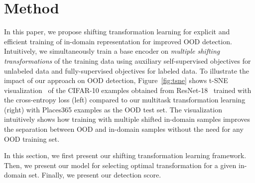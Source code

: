 \documentclass[letterpaper]{article} \usepackage{aaai22}  \usepackage{times}  \usepackage{helvet}  \usepackage{courier}  \usepackage[hyphens]{url}  \usepackage{graphicx} \urlstyle{rm} \def\UrlFont{\rm}  \usepackage{natbib}  \usepackage{caption} \DeclareCaptionStyle{ruled}{labelfont=normalfont,labelsep=colon,strut=off} \frenchspacing  \setlength{\pdfpagewidth}{8.5in}  \setlength{\pdfpageheight}{11in}
\begin{document}
%
  

\section{Method}
\label{sec:method}



In this paper, we propose shifting transformation learning for explicit and efficient training of in-domain representation for improved OOD detection.  
Intuitively, we simultaneously train a base encoder on \textit{multiple shifting transformations} of the training data using auxiliary self-supervised objectives for unlabeled data and fully-supervised objectives for labeled data.
To illustrate the impact of our approach on OOD detection, Figure~\ref{fig:tsne} shows t-SNE visualization~\cite{van2008visualizing} of the CIFAR-10 examples obtained from ResNet-18~\cite{he2016deep} trained with the cross-entropy loss (left) compared to our multitask transformation learning (right) with Places365 examples as the OOD test set.
The visualization intuitively shows how training with multiple shifted in-domain samples improves the separation between OOD and in-domain samples without the need for any OOD training set. 

In this section, we first present our shifting transformation learning framework. Then, we present our model for selecting optimal transformation for a given in-domain set. Finally, we present our detection score. 
\end{document}
